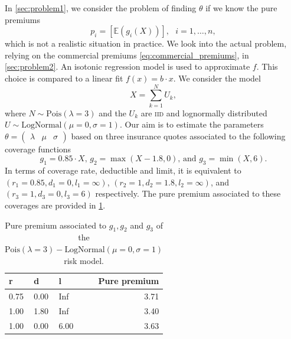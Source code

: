 \documentclass[10pt]{article}
\makeatletter
\newcommand*{\iid}{\textsc{iid}\@\xspace}
\makeatother
\begin{document}
In \cref{sec:problem1}, we consider the problem of finding $\theta$ if we know the pure premiums 
$$
p_i = \left[\mathbb{E}(g_i(X))\right],\text{ }i = 1,\ldots, n,
$$
which is not a realistic situation in practice. We look into the actual problem, relying on the commercial premiums \eqref{eq:commercial_premiums}, in \cref{sec:problem2}. An isotonic regression model is used to approximate $f$. This choice  is compared to a linear fit $f(x) =b\cdot x$. We consider the model
$$
X = \sum_{k=1}^NU_k,
$$
where $N\sim\text{Pois}(\lambda = 3)$ and the $U_k$ are \iid and lognormally distributed $U\sim\text{LogNormal}(\mu =0 , \sigma = 1)$. Our aim is to estimate the parameters $\theta = (\begin{array}{ccc}\lambda& \mu & \sigma\end{array})$ based on three insurance quotes associated to the following coverage functions
$$
g_1 = 0.85\cdot X\text{, } g_2 = \max(X - 1.8, 0) \text{, and }g_3 = \min(X, 6).
$$
In terms of coverage rate, deductible and limit, it is equivalent to $(r_1 = 0.85, d_1 = 0, l_1 = \infty)$, $(r_2 = 1, d_2 = 1.8, l_2 = \infty)$, and $(r_3 = 1, d_3 = 0, l_3 = 6)$ respectively. The pure premium associated to these coverages are provided in \cref{tab:true_pure_premium}.

\begin{table}[ht]
\centering
\begin{tabular}{llllr}
  \toprule
r & d & l &\phantom{abc}& Pure premium \\ 
  \midrule
0.75 & 0.00 & Inf && 3.71 \\ 
  1.00 & 1.80 & Inf && 3.40 \\ 
  1.00 & 0.00 & 6.00 && 3.63 \\ 
   \bottomrule
\end{tabular}
\caption{Pure premium associated to $g_1, g_2$ and $g_3$ of the $\text{Pois}(\lambda = 3)-\text{LogNormal}(\mu =0 , \sigma = 1)$ risk model.}
\label{tab:true_pure_premium}
\end{table}
\end{document}

